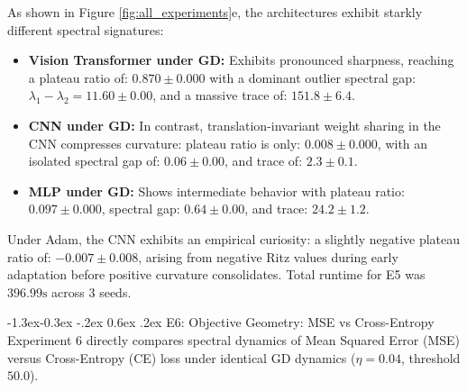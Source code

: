 \documentclass[10pt,twocolumn]{article}
\makeatletter
\renewcommand\subsection{\@startsection{subsection}{2}{\z@}%
                                     {-1.3ex\@plus -0.3ex \@minus -.2ex}%
                                     {0.6ex \@plus .2ex}%
                                     {\normalfont\normalsize\bfseries}}
\makeatother
\begin{document}
As shown in Figure \ref{fig:all_experiments}e, the architectures exhibit starkly different spectral signatures:
\begin{itemize}
    \item \textbf{Vision Transformer under GD:} Exhibits pronounced sharpness, reaching a plateau ratio of:
    $0.870 \pm 0.000$
    with a dominant outlier spectral gap:
    $\lambda_1 - \lambda_2 = 11.60 \pm 0.00$,
    and a massive trace of:
    $151.8 \pm 6.4$.
    \item \textbf{CNN under GD:} In contrast, translation-invariant weight sharing in the CNN compresses curvature: plateau ratio is only:
    $0.008 \pm 0.000$,
    with an isolated spectral gap of:
    $0.06 \pm 0.00$,
    and trace of:
    $2.3 \pm 0.1$.
    \item \textbf{MLP under GD:} Shows intermediate behavior with plateau ratio:
    $0.097 \pm 0.000$,
    spectral gap:
    $0.64 \pm 0.00$,
    and trace:
    $24.2 \pm 1.2$.
\end{itemize}
Under Adam, the CNN exhibits an empirical curiosity: a slightly negative plateau ratio of:
$-0.007 \pm 0.008$,
arising from negative Ritz values during early adaptation before positive curvature consolidates. Total runtime for E5 was $396.99\text{s}$ %
across 3 seeds.

\subsection{E6: Objective Geometry: MSE vs Cross-Entropy}
Experiment 6 directly compares spectral dynamics of Mean Squared Error (MSE) versus Cross-Entropy (CE) loss under identical GD dynamics ($\eta=0.04$, threshold $50.0$).
\end{document}
